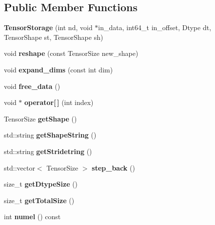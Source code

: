 \subsection*{Public Member Functions}
\begin{DoxyCompactItemize}
\item 
\mbox{\label{classTensorStorage_a185e38a60bf24d574dfa2030275bbd02}} 
{\bfseries Tensor\+Storage} (int nd, void $\ast$in\+\_\+data, int64\+\_\+t in\+\_\+offset, Dtype dt, Tensor\+Shape st, Tensor\+Shape sh)
\item 
\mbox{\label{classTensorStorage_a687c22d0f1c4ca429feb2b354096429e}} 
void {\bfseries reshape} (const Tensor\+Size new\+\_\+shape)
\item 
\mbox{\label{classTensorStorage_ac2016f8cbd28d2382a505177afe78323}} 
void {\bfseries expand\+\_\+dims} (const int dim)
\item 
\mbox{\label{classTensorStorage_a8667175f454eb36f70dc7e9dfc185ad4}} 
void {\bfseries free\+\_\+data} ()
\item 
\mbox{\label{classTensorStorage_afe0e9c666e89dea2fe69c97ffcd4a4c9}} 
void $\ast$ {\bfseries operator\mbox{[}$\,$\mbox{]}} (int index)
\item 
\mbox{\label{classTensorStorage_a3a4116b14541e8cae21110db98f5f7f5}} 
Tensor\+Size {\bfseries get\+Shape} ()
\item 
\mbox{\label{classTensorStorage_a239fb3bb35fb9db89b8413041c038654}} 
std\+::string {\bfseries get\+Shape\+String} ()
\item 
\mbox{\label{classTensorStorage_ab32ca2aaa137c68c0c3ceea76575022f}} 
std\+::string {\bfseries get\+Stridetring} ()
\item 
\mbox{\label{classTensorStorage_acb84883442f719b2d7aeda4dd743ef20}} 
std\+::vector$<$ Tensor\+Size $>$ {\bfseries step\+\_\+back} ()
\item 
\mbox{\label{classTensorStorage_a934218af682e938ebe22e89b2ae5edf4}} 
size\+\_\+t {\bfseries get\+Dtype\+Size} ()
\item 
\mbox{\label{classTensorStorage_a618069b19b2b9171d6b07d874696cf27}} 
size\+\_\+t {\bfseries get\+Total\+Size} ()
\item 
\mbox{\label{classTensorStorage_a21a43d53a12ce9a37e02909ead533c8f}} 
int {\bfseries numel} () const
\end{DoxyCompactItemize}
